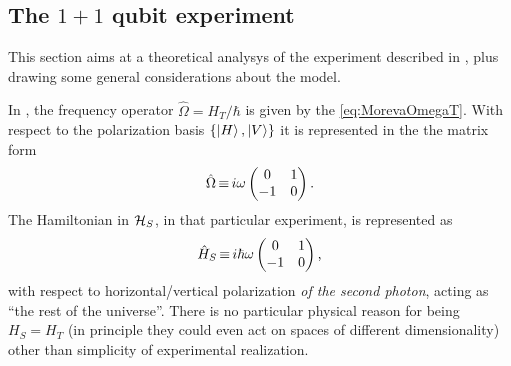 \subsection{The $1 + 1$ qubit experiment}\label{1qubitExp}

This section aims at a theoretical analysys of the experiment
described in \cite{Moreva:synthetic, Moreva:illustration},
plus drawing some general considerations about the model. 

In \cite{Moreva:illustration}, the frequency operator $\hat{\Omega} = H_T / \hbar$
is given by the \eqref{eq:MorevaOmegaT}. With respect to the polarization basis
$\qty{\ket{H}, \ket{V}}$ it is represented in the the matrix form
\begin{equation}
  \hat{\Omega} \operatorname*{\equiv} {
    i\omega
    \begin{pmatrix}
      0 & 1 \\
     -1 & 0
    \end{pmatrix}
  } \, \text{.}
\end{equation}
The Hamiltonian in $\mathcal{H}_S$, in that particular experiment, is represented as
\begin{equation}\label{eq:H_S}
  \hat{H}_S \operatorname*{\equiv} {
    i\hbar\omega
    \begin{pmatrix}
      0 & 1 \\
     -1 & 0
    \end{pmatrix}
  } \, \text{,}
\end{equation}
with respect to horizontal/vertical polarization \emph{of the second photon},
acting as ``the rest of the universe''.
There is no particular physical reason for being $H_S = H_T$
(in principle they could even act on spaces of different dimensionality)
other than simplicity of experimental realization.

